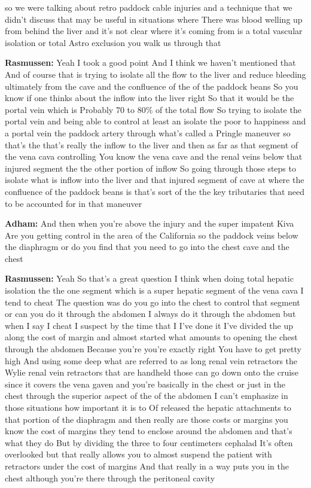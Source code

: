 \documentclass[
]{book}
\begin{document}
so we were talking about retro paddock cable injuries and a technique that we didn't discuss that may be useful in situations where There was blood welling up from behind the liver and it's not clear where it's coming from is a total vascular isolation or total Astro exclusion you walk us through that

\textbf{Rasmussen:} Yeah I took a good point And I think we haven't mentioned that And of course that is trying to isolate all the flow to the liver and reduce bleeding ultimately from the cave and the confluence of the of the paddock beans So you know if one thinks about the inflow into the liver right So that it would be the portal vein which is Probably 70 to 80\% of the total flow So trying to isolate the portal vein and being able to control at least an isolate the poor to happiness and a portal vein the paddock artery through what's called a Pringle maneuver so that's the that's really the inflow to the liver and then as far as that segment of the vena cava controlling You know the vena cave and the renal veins below that injured segment the the other portion of inflow So going through those steps to isolate what is inflow into the liver and that injured segment of cave at where the confluence of the paddock beans is that's sort of the the key tributaries that need to be accounted for in that maneuver

\textbf{Adham:} And then when you're above the injury and the super impatent Kiva Are you getting control in the area of the California so the paddock veins below the diaphragm or do you find that you need to go into the chest cave and the chest

\textbf{Rasmussen:} Yeah So that's a great question I think when doing total hepatic isolation the the one segment which is a super hepatic segment of the vena cava I tend to cheat The question was do you go into the chest to control that segment or can you do it through the abdomen I always do it through the abdomen but when I say I cheat I suspect by the time that I I've done it I've divided the up along the cost of margin and almost started what amounts to opening the chest through the abdomen Because you're you're exactly right You have to get pretty high And using some deep what are referred to as long renal vein retractors the Wylie renal vein retractors that are handheld those can go down onto the cruise since it covers the vena gaven and you're basically in the chest or just in the chest through the superior aspect of the of the abdomen I can't emphasize in those situations how important it is to Of released the hepatic attachments to that portion of the diaphragm and then really are those costs or margins you know the cost of margins they tend to enclose around the abdomen and that's what they do But by dividing the three to four centimeters cephalad It's often overlooked but that really allows you to almost suspend the patient with retractors under the cost of margins And that really in a way puts you in the chest although you're there through the peritoneal cavity
\end{document}
